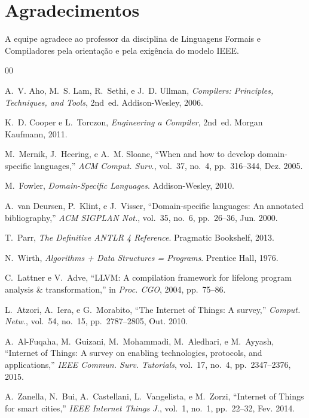 \documentclass[conference]{IEEEtran}
\begin{document}
\section*{Agradecimentos}
A equipe agradece ao professor da disciplina de Linguagens Formais e
Compiladores pela orientação e pela exigência do modelo IEEE.

\balance
\begin{thebibliography}{00}

A.~V. Aho, M.~S. Lam, R.~Sethi, e J.~D. Ullman,
\textit{Compilers: Principles, Techniques, and Tools}, 2nd~ed.
Addison-Wesley, 2006.

K.~D. Cooper e L.~Torczon,
\textit{Engineering a Compiler}, 2nd~ed.
Morgan Kaufmann, 2011.

M.~Mernik, J.~Heering, e A.~M. Sloane,
``When and how to develop domain-specific languages,''
\textit{ACM Comput. Surv.}, vol.~37, no.~4, pp.~316--344, Dez. 2005.

M.~Fowler,
\textit{Domain-Specific Languages}.
Addison-Wesley, 2010.

A.~van Deursen, P.~Klint, e J.~Visser,
``Domain-specific languages: An annotated bibliography,''
\textit{ACM SIGPLAN Not.}, vol.~35, no.~6, pp.~26--36, Jun. 2000.

T.~Parr,
\textit{The Definitive ANTLR 4 Reference}.
Pragmatic Bookshelf, 2013.

N.~Wirth,
\textit{Algorithms + Data Structures = Programs}.
Prentice Hall, 1976.

C.~Lattner e V.~Adve,
``LLVM: A compilation framework for lifelong program analysis \& transformation,''
in \textit{Proc. CGO}, 2004, pp.~75--86.

L.~Atzori, A.~Iera, e G.~Morabito,
``The Internet of Things: A survey,''
\textit{Comput. Netw.}, vol.~54, no.~15, pp.~2787--2805, Out. 2010.

A.~Al-Fuqaha, M.~Guizani, M.~Mohammadi, M.~Aledhari, e M.~Ayyash,
``Internet of Things: A survey on enabling technologies, protocols, and
applications,''
\textit{IEEE Commun. Surv. Tutorials}, vol.~17, no.~4, pp.~2347--2376, 2015.

A.~Zanella, N.~Bui, A.~Castellani, L.~Vangelista, e M.~Zorzi,
``Internet of Things for smart cities,''
\textit{IEEE Internet Things J.}, vol.~1, no.~1, pp.~22--32, Fev. 2014.


\end{thebibliography}
\end{document}
